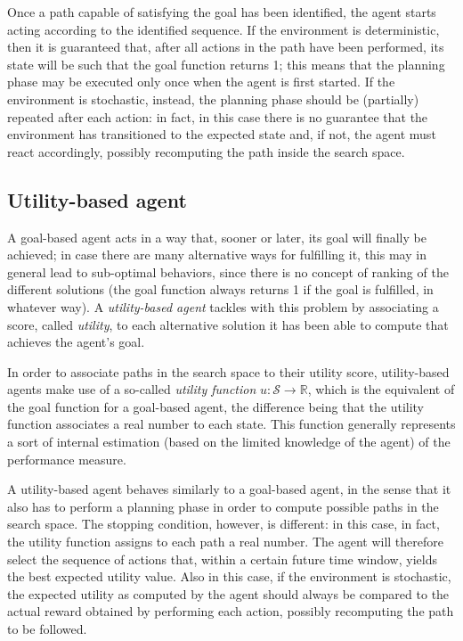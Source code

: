 \documentclass[letterpaper,headings=standardclasses]{scrartcl}
\begin{document}
Once a path capable of satisfying the goal has been identified, the agent starts acting according to the identified sequence. If the environment is deterministic, then it is guaranteed that, after all actions in the path have been performed, its state will be such that the goal function returns 1; this means that the planning phase may be executed only once when the agent is first started. If the environment is stochastic, instead, the planning phase should be (partially) repeated after each action: in fact, in this case there is no guarantee that the environment has transitioned to the expected state and, if not, the agent must react accordingly, possibly recomputing the path inside the search space.

\subsection{Utility-based agent}

A goal-based agent acts in a way that, sooner or later, its goal will finally be achieved; in case there are many alternative ways for fulfilling it, this may in general lead to sub-optimal behaviors, since there is no concept of ranking of the different solutions (the goal function always returns 1 if the goal is fulfilled, in whatever way). A \emph{utility-based agent} tackles with this problem by associating a score, called \emph{utility}, to each alternative solution it has been able to compute that achieves the agent's goal.

In order to associate paths in the search space to their utility score, utility-based agents make use of a so-called \emph{utility function} $u : \mathcal{S} \rightarrow \mathbb{R}$, which is the equivalent of the goal function for a goal-based agent, the difference being that the utility function associates a real number to each state. This function generally represents a sort of internal estimation (based on the limited knowledge of the agent) of the performance measure.

A utility-based agent behaves similarly to a goal-based agent, in the sense that it also has to perform a planning phase in order to compute possible paths in the search space. The stopping condition, however, is different: in this case, in fact, the utility function assigns to each path a real number. The agent will therefore select the sequence of actions that, within a certain future time window, yields the best expected utility value. Also in this case, if the environment is stochastic, the expected utility as computed by the agent should always be compared to the actual reward obtained by performing each action, possibly recomputing the path to be followed.
\end{document}
